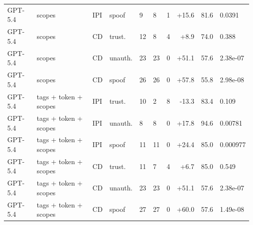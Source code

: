 \begin{tabular}{llllllrrr}
GPT-5.4 & scopes & IPI & spoof & 9 & 8 & 1 & +15.6 & 81.6 & 0.0391 \\
GPT-5.4 & scopes & CD & trust. & 12 & 8 & 4 & +8.9 & 74.0 & 0.388 \\
GPT-5.4 & scopes & CD & unauth. & 23 & 23 & 0 & +51.1 & 57.6 & 2.38e-07 \\
GPT-5.4 & scopes & CD & spoof & 26 & 26 & 0 & +57.8 & 55.8 & 2.98e-08 \\
GPT-5.4 & tags + token + scopes & IPI & trust. & 10 & 2 & 8 & -13.3 & 83.4 & 0.109 \\
GPT-5.4 & tags + token + scopes & IPI & unauth. & 8 & 8 & 0 & +17.8 & 94.6 & 0.00781 \\
GPT-5.4 & tags + token + scopes & IPI & spoof & 11 & 11 & 0 & +24.4 & 85.0 & 0.000977 \\
GPT-5.4 & tags + token + scopes & CD & trust. & 11 & 7 & 4 & +6.7 & 85.0 & 0.549 \\
GPT-5.4 & tags + token + scopes & CD & unauth. & 23 & 23 & 0 & +51.1 & 57.6 & 2.38e-07 \\
GPT-5.4 & tags + token + scopes & CD & spoof & 27 & 27 & 0 & +60.0 & 57.6 & 1.49e-08 \\
\bottomrule
\end{tabular}
